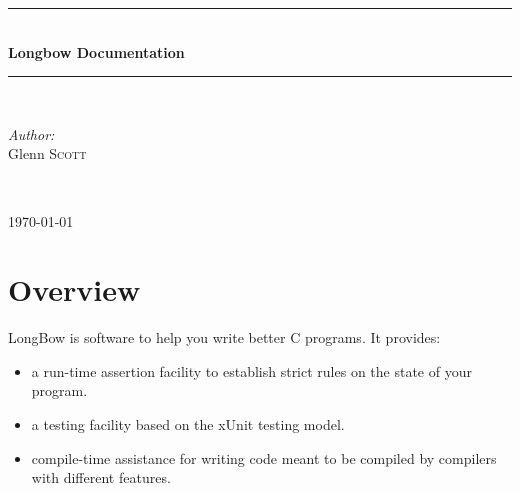 \documentclass[12pt]{article} %
\begin{document}
\begin{titlepage}

\newcommand{\HRule}{\rule{\linewidth}{0.5mm}} %

\center %


\HRule \\[0.4cm]
{ \huge \bfseries Longbow Documentation}\\[0.4cm] %
\HRule \\[1.5cm]

\begin{minipage}{0.4\textwidth}
\begin{flushleft} \large
\emph{Author:}\\
Glenn \textsc{Scott} %
\end{flushleft}
\end{minipage}
~

{\large \today}\\[3cm] %


\vfill %

\end{titlepage}


\tableofcontents %
\newpage
\section{Overview} %

LongBow is software to help you write better C programs. It provides: 
\begin{itemize}
\item a  run-time assertion facility to establish strict rules on the state of your program.
\item a testing facility based on the xUnit testing model.
\item compile-time assistance for writing code meant to be compiled by compilers with different features. 
\end{itemize}
\end{document}
